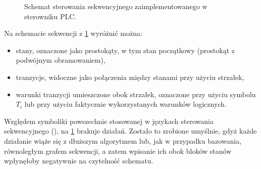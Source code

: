 \begin{figure}[ht]
    \centering
    
    
    \caption{Schemat sterowania sekwencyjnego zaimplementowanego w sterowniku PLC.}
    \label{fig:schemat_sekwencji}
\end{figure}

Na schemacie sekwencji z \cref{fig:schemat_sekwencji} wyróżnić można:
\begin{itemize}
    \item stany, oznaczone jako prostokąty, w tym stan początkowy (prostokąt z podwójnym obramowaniem),
    \item tranzycje, widoczne jako połączenia między stanami przy użyciu strzałek,
    \item warunki tranzycji umieszczone obok strzałek, oznaczone przy użyciu symbolu $T_i$ lub przy użyciu faktycznie wykorzystanych warunków logicznych.
\end{itemize}

Względem symboliki powszechnie stosowanej w językach sterowania sekwencyjnego (\cite{SEKW1}\cite{SEKW2}), na \cref{fig:schemat_sekwencji} brakuje działań. Zostało to zrobione umyślnie, gdyż każde działanie wiąże się z dłuższym algorytmem lub, jak w przypadku bazowania, równoległym grafem sekwencji, a zatem wpisanie ich obok bloków stanów wpłynęłoby negatywnie na czytelność schematu.

